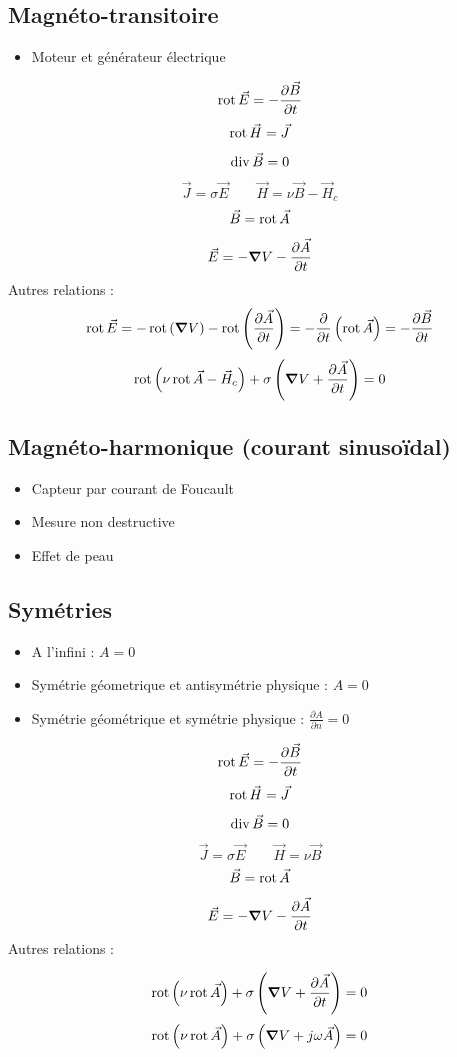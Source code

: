 \documentclass[resume]{subfiles}
\begin{document}
\subsection{Magnéto-transitoire}
\begin{itemize}
\item Moteur et générateur électrique
\end{itemize}

$$\operatorname{rot}{\vec{E}}=-\frac{\partial \vec{B}}{\partial t}$$
$$\operatorname{rot}{\vec{H}}=\vec{J}$$
$$\operatorname{div}{\vec{B}}=0$$
$$\vec{J}=\sigma\vec{E}\qquad \vec{H}=\nu\vec{B}-\vec{H}_c$$
$$\vec{B}=\operatorname{rot}{\vec{A}}$$
$$\vec{E}=-\grad V-\frac{\partial \vec{A}}{\partial t}$$
Autres relations :
$$\operatorname{rot}{\vec{E}}=-\operatorname{rot}\left(\grad V\right)-\operatorname{rot}\left(\frac{\partial \vec{A}}{\partial t}\right)=-\frac{\partial}{\partial t}\left(\operatorname{rot} \vec{A}\right)=-\frac{\partial \vec{B}}{\partial t}$$
$$\operatorname{rot}\left(\nu \operatorname{rot}\vec{A}-\vec{H}_c\right)+\sigma\left(\grad V+\frac{\partial \vec{A}}{\partial t}\right)=0$$


\subsection{Magnéto-harmonique (courant sinusoïdal)}
\begin{itemize}
\item Capteur par courant de Foucault
\item Mesure non destructive
\item Effet de peau
\end{itemize}
\subsection{Symétries}
\begin{itemize}
\item A l'infini : $A=0$
\item Symétrie géometrique et antisymétrie physique : $A=0$
\item Symétrie géométrique et symétrie physique : $\frac{\partial A}{\partial n}=0$
\end{itemize}


$$\operatorname{rot} \vec{E}=-\frac{\partial \vec{B}}{\partial t}$$
$$\operatorname{rot} \vec{H}=\vec{J}$$
$$\operatorname{div} \vec{B}=0$$
$$\vec{J}=\sigma \vec{E}\qquad \vec{H}=\nu \vec{B}$$
$$\vec{B}=\operatorname{rot} \vec{A}$$
$$\vec{E}=-\grad V-\frac{\partial \vec{A}}{\partial t}$$
Autres relations :

$$\operatorname{rot}\left(\nu \operatorname{rot}\vec{A}\right)+\sigma\left(\grad V+\frac{\partial \vec{A}}{\partial t}\right)=0$$
$$\operatorname{rot}\left(\nu \operatorname{rot}\vec{A}\right)+\sigma\left(\grad V+j\omega \vec{A}\right)=0$$
\end{document}
